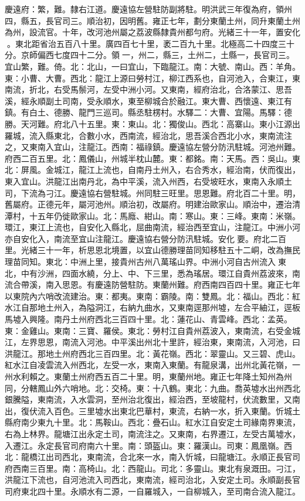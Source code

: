 \begin{pinyinscope}
慶遠府：繁，難。隸右江道。慶遠協左營駐防副將駐。明洪武三年復為府，領州四，縣五，長官司三。順治初，因明舊。雍正七年，劃分東蘭土州，同升東蘭土州為州，設流官。十年，改河池州屬之荔波縣隸貴州都勻府。光緒三十一年，置安化。東北距省治五百八十里。廣四百七十里，袤二百九十里。北極高二十四度三十分。京師偏西七度四十二分。領一，州二，縣三，土州二，土縣一，長官司三。宜山繁，難。倚。北：北山，一曰宜山，下臨龍江。南：大號、南山。西：羊角。東：小曹、大曹。西北：龍江上源曰勞村江，柳江西系也，自河池入，合東江，東南流，折北，右受馬鬃河，左受中洲小河。又東南，經府治北，合洛蒙江、思吾溪，經永順副土司南，受永順水，東至柳城合於融江。東大曹、西懷遠、東江有鎮。有白土、德勝、龍門三巡司。縣丞駐楞村。水驛二：大曹、宜陽。馬驛：德勝。天河難。府北八十五里。東：東山。北：獨俊山。西北：高寨山。東小江源出羅城，流入縣東北，合數小水，西南流，經治北，思吾溪合西北小水，東南流注之，又東南入宜山，注龍江。西南：福祿鎮。慶遠協左營分防汛駐城。河池州難。府西二百五里。北：鳳儀山，州城半枕山麓。東：都銘。南：天馬。西：吳山。東北：屏風。金城江，龍江上流也，自南丹土州入，右合秀水，經治南，伏而復出，東入宜山。洪龍江出南丹北，為中平溪，流入州西，右受坡旺水，東南入永順土司，下流為刁江。慶遠協右營駐城。州同駐三旺里。思恩難。府北百二十里。明，舊屬府。正德元年，屬河池州。順治初，改屬府。明建治歐家山。順治中，遷治清潭村，十五年仍徙歐家山。北：馬廕、紺山。南：寒山。東：三峰。東南：米嶺。環江，東江上流也，自安化入縣北，屈曲南流，經治西至宜山，注龍江。中洲小河亦自安化入，南流至宜山注龍江。慶遠協右營分防汛駐城。安化要。府北二百里。光緒三十一年，析思恩北境置，以宜山德勝理苗同知移駐五十二峒，改為撫民理苗同知。東北：中洲上里，接貴州古州八萬瑤山界。中洲小河自古州流入東北，中有沙洲，四面水繞，分上、中、下三里，悉為瑤居。環江自貴州荔波來，南流合帶溪，南入思恩。有慶遠防營駐防。東蘭州難。府西南四百四十里。雍正七年以東院內六哨改流建治。東：都夷。東南：霸陵。南：雙鳳。北：福山。西北：紅水江自那地土州入，為隘洞江，右納九曲水，又東南逕那州墟，左合平紬江，逕板馬墟入興隆。南丹土州府西北三百四十里。北：蓮花山、青雲峰。西北：孟英。東：金雞山。東南：三寶、羅侯。東北：勞村江自貴州荔波入，東南流，右受金城江，左界思恩，南流入河池。中平溪出州北十里許，經治東，東南流，入河池，曰洪龍江。那地土州府西北三百四里。北：黃花嶺。西北：翠靈山。又三碧、虎山。紅水江自凌雲流入州西北，左受一水，東南入東蘭。有龍泉溝，出州北黃花嶺，一州水利賴之。東蘭土州府西五百二十里。明，東蘭州地。雍正七年降土知州為州同，分轄鳳山外六哨地。北：交椅。東：十八鶴。東北：九曲。喬英墟水出州西北銀騰隘，東南流，入水雲洞，至州治北復出，經治西，至坡龍村，伏流數里，又南出，復伏流入百色。三里墟水出東北巴華村，東流，右納一水，折入東蘭。忻城土縣府南少東九十里。北：馬鞍山。西北：疊石山。紅水江自安定土司緣南界東流，右為上林界。龍塘江出永定土司，南流注之。又東南，右界遷江，左受古萬墟水，入遷江。永定長官司府南六十里。南：頭盔山。東：羅漢山。司東：鳳凰嶺。西北：龍橋江出司西北，東南流，合北來一水，南入忻城，曰龍塘江。永順正長官司府西南三百里。南：高椅山。北：西龍山。司北：多靈山。東北有泉溉田。刁江，洪龍江下流也，自河池流入司西北，東南流，經司治北，入安定土司。永順副長官司府東北四十里。永順水有二源，一自羅城入，一自柳城入，至司南合流入龍江。


\end{pinyinscope}
